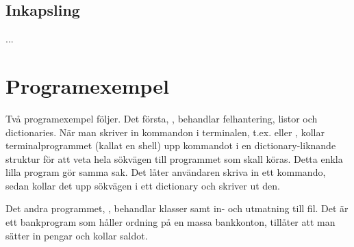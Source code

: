 \subsection{Inkapsling}

...



\section{Programexempel}

Två programexempel följer. Det första, , behandlar felhantering,
listor och dictionaries. När man skriver in kommandon i terminalen, t.ex.
 eller , kollar terminalprogrammet (kallat en shell) upp
kommandot i en dictionary-liknande struktur för att veta hela sökvägen till 
programmet som skall köras. Detta enkla lilla program gör samma sak. Det 
låter användaren skriva in ett kommando, sedan kollar det upp sökvägen i ett 
dictionary och skriver ut den.


Det andra programmet, , behandlar klasser samt in-
och utmatning till fil. Det är
ett bankprogram som håller ordning på en massa bankkonton, tillåter att man
sätter in pengar och kollar saldot.

